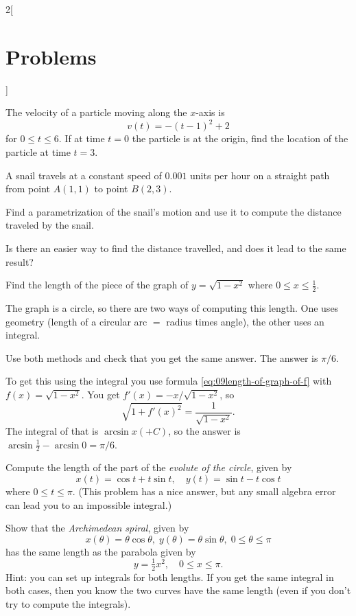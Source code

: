 \begin{multicols}{2}[
\section{Problems} %
\problemfont %
]\setlength{\parindent}{0pt}

\problem The velocity of a particle moving along the $x$-axis is %
\[
  v(t)=-(t-1)^2+2
\]
for $0 \leq t \leq 6$. If at time $t=0$ the particle is at the origin, find the
location of the particle at time $t=3$.

\problem A snail travels at a constant speed of $0.001$ units per hour on a %
straight path from point $A(1,1)$ to point $B(2,3)$.

\subprob Find a parametrization of the snail's motion and use it to compute the
distance traveled by the snail.

\subprob Is there an easier way to find the distance travelled, and does it
lead to the same result?

\problem Find the length of the piece of the graph of $y=\sqrt{1-x^2}$ where %
$0\le x\le \frac12$.

The graph is a circle, so there are two ways of computing this
length.  One uses geometry (length of a circular arc $=$ radius times angle),
the other uses an integral.

Use both methods and check that you get the same answer.
\answer %
The answer is $\pi/6$.

To get this using the integral you use formula
\eqref{eq:09length-of-graph-of-f} with $f(x) = \sqrt{1-x^2}$.
You get $f'(x) = -x/\sqrt{1-x^2}$, so 
\[
\sqrt{1+f'(x)^2} = \frac{1}{\sqrt{1-x^2}}.
\]
The integral of that is $\arcsin x (+C)$, so the answer is
$\arcsin\tfrac12 - \arcsin 0 = \pi/6$.
\endanswer

\problem Compute the length of the part of the \textit{evolute of the circle}, %
given by
\[
x(t) = \cos t + t\sin t, \quad y(t) = \sin t - t\cos t
\]
where $0 \leq t \leq \pi$.
(This problem has a nice answer, but any small algebra error can lead you to an
impossible integral.)

\problem \groupproblem Show that the \textit{Archimedean spiral}, given by %
\[
x(\theta) = \theta\cos\theta, \; y(\theta) = \theta\sin\theta,\;
0\le \theta\le \pi
\]
has the same length as the parabola given by
\[
y=\tfrac12 x^2,\quad 0\le x\le \pi.
\]
Hint: you can set up integrals for both lengths.  If you get the same
integral in both cases, then you know the two curves have the same
length (even if you don't try to compute the integrals).


\end{multicols}
